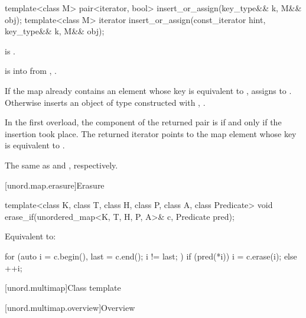 %
\begin{itemdecl}
template<class M>
  pair<iterator, bool> insert_or_assign(key_type&& k, M&& obj);
template<class M>
  iterator insert_or_assign(const_iterator hint, key_type&& k, M&& obj);
\end{itemdecl}

\begin{itemdescr}
\pnum
\mandates
{} is .

\expects
{} is  into 
from , .

\pnum
\effects
If the map already contains an element 
whose key is equivalent to ,
assigns  to .
Otherwise inserts an object of type 
constructed with , .

\pnum
\returns
In the first overload,
the  component of the returned pair is 
if and only if the insertion took place.
The returned iterator points to the map element
whose key is equivalent to .

\pnum
\complexity
The same as  and ,
respectively.
\end{itemdescr}

[unord.map.erasure]{Erasure}

%
\begin{itemdecl}
template<class K, class T, class H, class P, class A, class Predicate>
  void erase_if(unordered_map<K, T, H, P, A>& c, Predicate pred);
\end{itemdecl}

\begin{itemdescr}
\pnum
\effects
Equivalent to:
\begin{codeblock}
for (auto i = c.begin(), last = c.end(); i != last; ) {
  if (pred(*i)) {
    i = c.erase(i);
  } else {
    ++i;
  }
}
\end{codeblock}
\end{itemdescr}

[unord.multimap]{Class template }%

[unord.multimap.overview]{Overview}


